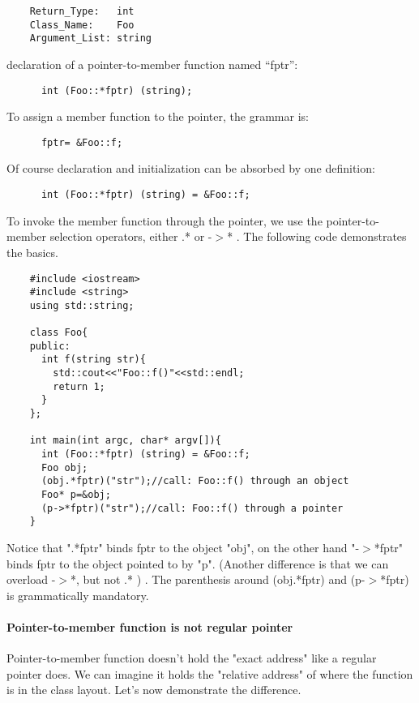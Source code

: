 \documentclass{book}
\begin{document}
\begin{lstlisting}
    Return_Type:   int
    Class_Name:    Foo
    Argument_List: string
\end{lstlisting}
    declaration of a  pointer-to-member function named ``fptr'':
\begin{lstlisting}
      int (Foo::*fptr) (string);
\end{lstlisting}

To assign a member function to the pointer, the grammar is:

\begin{lstlisting}
      fptr= &Foo::f;
\end{lstlisting}
Of course declaration and initialization can be absorbed by one definition:

\begin{lstlisting}
      int (Foo::*fptr) (string) = &Foo::f;
\end{lstlisting}
To invoke the member function through the pointer, we use the pointer-to-member selection operators, either .* or -$>$* . The following code demonstrates the basics.

\begin{lstlisting}
    #include <iostream>
    #include <string>
    using std::string;
     
    class Foo{
    public:
      int f(string str){
        std::cout<<"Foo::f()"<<std::endl;
        return 1;
      }
    };
     
    int main(int argc, char* argv[]){
      int (Foo::*fptr) (string) = &Foo::f;
      Foo obj;
      (obj.*fptr)("str");//call: Foo::f() through an object
      Foo* p=&obj;
      (p->*fptr)("str");//call: Foo::f() through a pointer
    }
\end{lstlisting}
Notice that ".*fptr" binds fptr to the object "obj", on the other hand "-$>$*fptr" binds fptr to the object pointed to by "p".
(Another difference is that we can overload -$>$*, but not .* ) . The parenthesis around (obj.*fptr) and (p-$>$*fptr) is grammatically mandatory.

\paragraph{Pointer-to-member function is not regular pointer}

Pointer-to-member function doesn't hold the "exact address" like a regular pointer does.
We can imagine it holds the "relative address" of where the function is in the class layout. Let's now demonstrate the difference.
\end{document}
